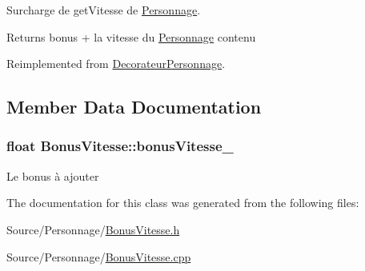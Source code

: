 Surcharge de get\-Vitesse de \hyperlink{classPersonnage}{Personnage}. 

\begin{DoxyReturn}{Returns}
bonus + la vitesse du \hyperlink{classPersonnage}{Personnage} contenu 
\end{DoxyReturn}


Reimplemented from \hyperlink{classDecorateurPersonnage_a53f882d120584c22947493547ae2df6e}{Decorateur\-Personnage}.



\subsection{Member Data Documentation}
\hypertarget{classBonusVitesse_a5942cf6038e6604f6ac10cfa9f05d246}{
\subsubsection[{bonus\-Vitesse\-\_\-}]{\setlength{\rightskip}{0pt plus 5cm}float Bonus\-Vitesse\-::bonus\-Vitesse\-\_\-\hspace{0.3cm}{\ttfamily [protected]}}}\label{classBonusVitesse_a5942cf6038e6604f6ac10cfa9f05d246}
Le bonus à ajouter 

The documentation for this class was generated from the following files\-:\begin{DoxyCompactItemize}
\item 
Source/\-Personnage/\hyperlink{BonusVitesse_8h}{Bonus\-Vitesse.\-h}\item 
Source/\-Personnage/\hyperlink{BonusVitesse_8cpp}{Bonus\-Vitesse.\-cpp}\end{DoxyCompactItemize}
